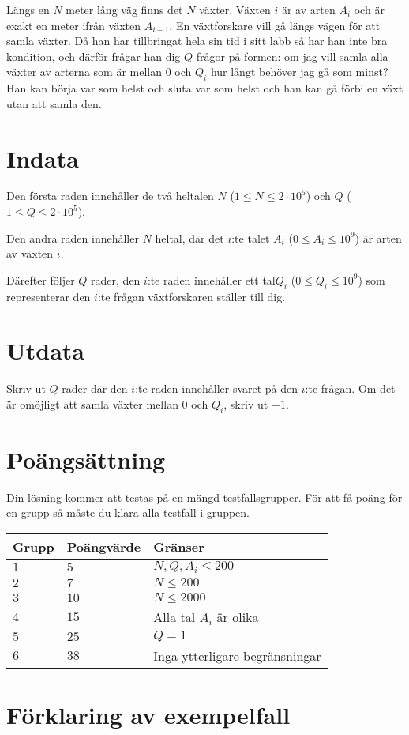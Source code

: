 Längs en $N$ meter lång väg finns det $N$ växter. Växten $i$ är av arten $A_i$ och är exakt en meter ifrån växten $A_{i-1}$. En växtforskare vill gå längs vägen för att samla växter. Då han har tillbringat hela sin tid i sitt labb så har han inte bra kondition,
och därför frågar han dig $Q$ frågor på formen: om jag vill samla alla växter av arterna som är mellan $0$ och $Q_i$ hur långt behöver jag gå som minst?
Han kan börja var som helst och sluta var som helst och han kan gå förbi en växt utan att samla den.
\section*{Indata}
Den första raden innehåller de två heltalen $N$ ($1\leq N \leq 2 \cdot 10^5$) och $Q$ ($1 \leq Q \leq 2 \cdot 10^5$).

Den andra raden innehåller $N$ heltal, där det $i$:te talet $A_i$ ($0\le A_i \le 10^9$) är arten av växten $i$.

Därefter följer $Q$ rader, den $i$:te raden innehåller ett tal$Q_i$ ($0 \leq Q_i \leq 10^9$) som representerar den $i$:te frågan växtforskaren ställer till dig.

\section*{Utdata}
Skriv ut $Q$ rader där den $i$:te raden innehåller svaret på den $i$:te frågan. Om det är omöjligt att samla växter mellan $0$ och $Q_i$, skriv ut $-1$.

\section*{Poängsättning}
Din lösning kommer att testas på en mängd testfallsgrupper.
För att få poäng för en grupp så måste du klara alla testfall i gruppen.

\noindent
\begin{tabular}{| l | l | p{12cm} |}
  \hline
  Grupp & Poängvärde & Gränser \\ \hline
  $1$   & $5$       & $N, Q, A_i \leq 200 $\\ \hline
  $2$   & $7$       & $N \leq 200 $\\ \hline
  $3$   & $10$       & $N \leq 2000 $  \\ \hline
  $4$   & $15$       & Alla tal $A_i$ är olika \\ \hline
  $5$   & $25$       & $Q = 1$ \\ \hline
  $6$   & $38$       & Inga ytterligare begränsningar \\ \hline
\end{tabular}

\section*{Förklaring av exempelfall}

